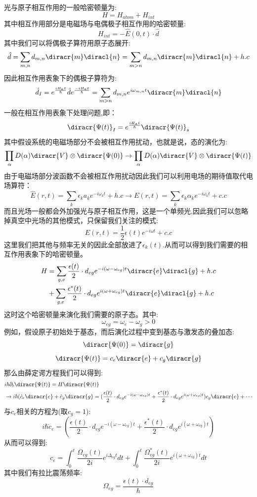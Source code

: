 光与原子相互作用的一般哈密顿量为:
\[H=H_{atom}+H_{int}\]
其中相互作用部分是电磁场与电偶极子相互作用的哈密顿量:
\[H_{int}=-\hat{E}(0,t)\cdot \hat{d}\]
其中我们可以将偶极子算符用原子态展开:
\[\hat{d}=\sum_{m,n}d_{m,n}\diracr{m}\diracl{n}=\sum_{m>n}d_{m,n}\diracr{m}\diracl{n}+h.c\]
因此相互作用表象下的偶极子算符为:
\[\hat{d}_I=e^{\frac{iH_at}{\hbar}}\hat{d}e^{\frac{-iH_at}{\hbar}}=\sum_{m>n}d_{m,n}e^{i\omega_{m,n}t}\diracr{m}\diracl{n}\]
一般在相互作用表象下处理问题,即：
\[\diracr{\Psi(t)}_I=e^{\frac{iH_at}{\hbar}}\diracr{\Psi(t)}_s\]
其中假设系统的电磁场部分不会被相互作用扰动，也就是说，态的演化为:
\[\prod_{\alpha}D(\alpha)\diracr{V}\otimes\diracr{\Psi(0)}\rightarrow\prod_{\alpha}D(\alpha)\diracr{V}\otimes\diracr{\Psi(t)}\]
由于电磁场部分波函数不会被相互作用扰动因此我们可以利用电场的期待值取代电场算符：
\[\hat{E}(r,t)=\sum_k \epsilon_k a_ke^{-i\omega_kt}+h.c\rightarrow E(r,t)=\sum_k \epsilon_k \alpha_ke^{-i\omega_kt}+c.c\]
而且光场一般都会外加强光与原子相互作用，这是一个单频光,因此我们可以忽略掉真空中光场的其他模式，只保留我们关注的模式:
\[E(r,t)=\frac{1}{2}\epsilon(t)e^{-i\omega t}+c.c\]
这里我们把其他与频率无关的因此全部放进了$\epsilon_k(t)$.从而可以得到我们需要的相互作用表象下的哈密顿量。
\begin{align}
\notag H&=\sum_{g,e}\frac{\epsilon(t)}{2}\cdot d_{eg}e^{-i(\omega-\omega_{eg})t}\diracr{e}\diracl{g}+h.c\\
&+\sum_{g,e}\frac{\epsilon^*(t)}{2}\cdot d_{eg}e^{i(\omega+\omega_{eg})t}\diracr{e}\diracl{g}+h.c
\end{align}
这时这个哈密顿量来演化我们需要的原子态。其中:
\[\omega_{eg}=\omega_e-\omega_g>0\]
例如，假设原子初始处于基态，而后演化过程中变到基态与激发态的叠加态:
\[\diracr{\Psi(0)}=\diracr{g}\]
\[\diracr{\Psi(t)}=c_e\diracr{e}+c_g\diracr{g}\]
那么由薛定谔方程我们可以得到:
\begin{align*}
&i\hbar\partial_t\diracr{\Psi(t)}=H\diracr{\Psi(t)}\\
&\rightarrow i\hbar(\dot{c}_e\diracr{e}+\dot{c}_g\diracr{g}=(\frac{\epsilon(t)}{2}\cdot d_{eg}e^{-i(\omega-\omega_{eg})t}+\frac{\epsilon^*(t)}{2}\cdot d_{eg}e^{i(\omega+\omega_{eg})t})c_g\diracr{e}+\cdots
\end{align*}
与$c_e$相关的方程为(取$c_g=1$):
\[i\hbar\dot{c}_e=(\frac{\epsilon(t)}{2}\cdot d_{eg}e^{-i(\omega-\omega_{eg})t}+\frac{\epsilon^*(t)}{2}\cdot d_{eg}e^{i(\omega+\omega_{eg})t})\]
从而可以得到:
\[c_e=\int_{0}^t\frac{\Omega_{eg}(t)}{2i}e^{i\Delta_{eg}t}dt+\int_{0}^t\frac{\Omega^*_{eg}(t)}{2i}e^{i(\omega+\omega_{eg})t}dt\]
其中我们有拉比震荡频率:
\[\Omega_{eg}=\frac{\epsilon(t)\cdot d_{eg}}{\hbar}\]
